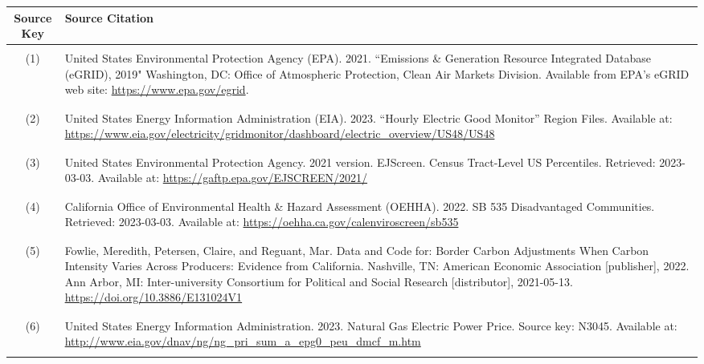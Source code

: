 \begin{center}
    \singlespacing
    \renewcommand{\arraystretch}{1.5}
    \small
    \begin{longtable}{c L{0.8\textwidth}}
        \hline\hline
        Source Key & Source Citation\\
        \hline \\[-3ex]
        (1) & United States Environmental Protection Agency (EPA). 2021. ``Emissions \& Generation Resource Integrated Database (eGRID), 2019" Washington, DC: Office of Atmospheric Protection, Clean Air Markets Division. Available from EPA's eGRID web site: \url{https://www.epa.gov/egrid}.\\ \\[-3ex]
        \hline \\[-3ex]
        (2) & United States Energy Information Administration (EIA). 2023. ``Hourly Electric Good Monitor'' Region Files. Available at: \url{https://www.eia.gov/electricity/gridmonitor/dashboard/electric_overview/US48/US48}\\ \\[-3ex]
        \hline \\[-3ex]
        (3) & United States Environmental Protection Agency. 2021 version. EJScreen. Census Tract-Level US Percentiles. Retrieved: 2023-03-03. Available at: \url{https://gaftp.epa.gov/EJSCREEN/2021/} \\ \\[-3ex]
        \hline \\[-3ex]
        (4) & California Office of Environmental Health \& Hazard Assessment (OEHHA). 2022. SB 535 Disadvantaged Communities. Retrieved: 2023-03-03. Available at: \url{https://oehha.ca.gov/calenviroscreen/sb535} \\ \\[-3ex]
        \hline \\[-3ex]
        (5) & Fowlie, Meredith, Petersen, Claire, and Reguant, Mar. Data and Code for: Border Carbon Adjustments When Carbon Intensity Varies Across Producers: Evidence from California. Nashville, TN: American Economic Association [publisher], 2022. Ann Arbor, MI: Inter-university Consortium for Political and Social Research [distributor], 2021-05-13. \url{https://doi.org/10.3886/E131024V1} \\ \\[-3ex]
        \hline \\[-3ex]
        (6) & United States Energy Information Administration. 2023. Natural Gas Electric Power Price. Source key: N3045. Available at: \url{http://www.eia.gov/dnav/ng/ng_pri_sum_a_epg0_peu_dmcf_m.htm} \\ \\[-3ex]

\end{longtable}
\end{center}
